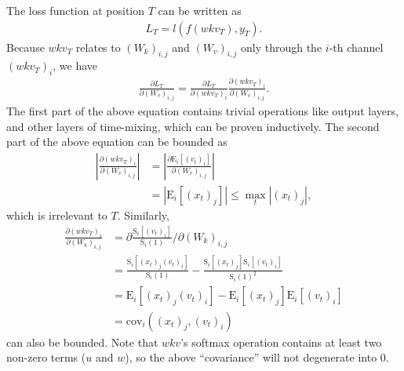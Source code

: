 \documentclass[11pt]{article}
\begin{document}
The loss function at position $T$ can be written as
\begin{align}
L_T =l(f(wkv_T), y_T).
\end{align}
Because $wkv_T$ relates to $(W_k)_{i,j}$ and $(W_v)_{i,j}$ only through the $i$-th channel $(wkv_T)_i$, we have
\begin{align} \frac{\partial L_T}{\partial (W_v)_{i,j}} = \frac{\partial L_T}{\partial (wkv_T)_i} \frac{\partial (wkv_T)_i}{\partial (W_v)_{i,j}}. \end{align}
The first part of the above equation contains trivial operations like output layers, and other layers of time-mixing, which can be proven inductively.
The second part of the above equation can be bounded as
\begin{align}
\left|\frac{\partial (wkv_T)_i}{\partial (W_v)_{i,j}}\right| &= \left| \frac{\partial \mathrm{E}_i[(v_t)_i]}{\partial (W_v)_{i,j}} \right| \nonumber\\
&= |\mathrm{E}_{i}[(x_t)_j]| \leq \max_t |(x_t)_j|,
\end{align}
which is irrelevant to $T$. Similarly,
\begin{align}
\frac{\partial (wkv_T)_i}{\partial (W_k)_{i,j}} &= \partial \frac{\mathrm{S}_i[(v_t)_i]}{\mathrm{S}_i(1)}/ \partial(W_k)_{i,j} \nonumber \\
&= \frac{\mathrm{S}_i[(x_t)_j (v_t)_i]}{\mathrm{S}_i(1)} - \frac{\mathrm{S}_i[(x_t)_j]\mathrm{S}_i[(v_t)_i]}{\mathrm{S}_i(1)^2} \nonumber\\
&= \mathrm{E}_{i}[(x_t)_j(v_t)_i] - \mathrm{E}_{i}[(x_t)_j]\mathrm{E}_{i}[(v_t)_i] \nonumber\\
&= \mathrm{cov}_i((x_t)_j, (v_t)_i)
\end{align}
can also be bounded. Note that $wkv$'s softmax operation contains at least two non-zero terms ($u$ and $w$), so the above ``covariance'' will not degenerate into 0.

\end{document}
